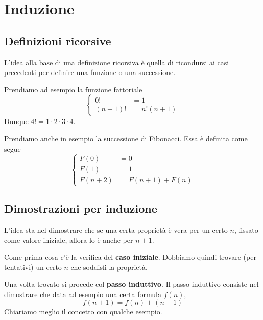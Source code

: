 \chapter{Induzione}
\section{Definizioni ricorsive}
L'idea alla base di una definizione ricorsiva \`e quella di ricondursi ai casi
precedenti per definire una funzione o una successione.

\begin{example}
	Prendiamo ad esempio la funzione fattoriale
	\begin{equation*}
		\begin{cases}
			0!       & = 1          \\
			(n + 1)! & = n! (n + 1)
		\end{cases}
	\end{equation*}
	Dunque $4! = 1 \cdot 2 \cdot 3 \cdot 4$.
\end{example}

\begin{example}
	Prendiamo anche in esempio la successione di Fibonacci. Essa \`e definita come
	segue
	\begin{equation*}
		\begin{cases}
			F(0)     & = 0               \\
			F(1)     & = 1               \\
			F(n + 2) & = F(n + 1) + F(n)
		\end{cases}
	\end{equation*}
\end{example}

\section{Dimostrazioni per induzione}
L'idea sta nel dimostrare che se una certa propriet\`a \`e vera per un certo $n$,
fissato come valore iniziale, allora lo \`e anche per $n + 1$.

Come prima cosa c'\`e la verifica del \textbf{caso iniziale}. Dobbiamo quindi trovare
(per tentativi) un certo $n$ che soddisfi la propriet\`a.

Una volta trovato si procede
col \textbf{passo induttivo}. Il passo induttivo consiste nel dimostrare che data
ad esempio una certa formula $f(n)$,
\begin{equation*}
	f(n + 1) = f(n) + (n + 1)
\end{equation*}
Chiariamo meglio il concetto con qualche esempio.

